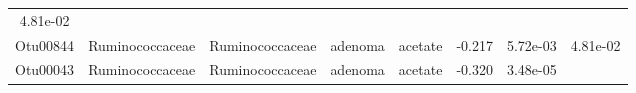 \documentclass[11pt,]{article}
\begin{document}
\begin{longtable}[]{@{}cccccccc@{}}
\begin{minipage}[t]{0.08\columnwidth}
4.81e-02\strut
\end{minipage}\tabularnewline
\begin{minipage}[t]{0.08\columnwidth}\centering\strut
Otu00844\strut
\end{minipage} & \begin{minipage}[t]{0.15\columnwidth}\centering\strut
Ruminococcaceae\strut
\end{minipage} & \begin{minipage}[t]{0.15\columnwidth}\centering\strut
Ruminococcaceae\strut
\end{minipage} & \begin{minipage}[t]{0.08\columnwidth}\centering\strut
adenoma\strut
\end{minipage} & \begin{minipage}[t]{0.09\columnwidth}\centering\strut
acetate\strut
\end{minipage} & \begin{minipage}[t]{0.07\columnwidth}\centering\strut
-0.217\strut
\end{minipage} & \begin{minipage}[t]{0.08\columnwidth}\centering\strut
5.72e-03\strut
\end{minipage} & \begin{minipage}[t]{0.08\columnwidth}\centering\strut
4.81e-02\strut
\end{minipage}\tabularnewline
\begin{minipage}[t]{0.08\columnwidth}\centering\strut
Otu00043\strut
\end{minipage} & \begin{minipage}[t]{0.15\columnwidth}\centering\strut
Ruminococcaceae\strut
\end{minipage} & \begin{minipage}[t]{0.15\columnwidth}\centering\strut
Ruminococcaceae\strut
\end{minipage} & \begin{minipage}[t]{0.08\columnwidth}\centering\strut
adenoma\strut
\end{minipage} & \begin{minipage}[t]{0.09\columnwidth}\centering\strut
acetate\strut
\end{minipage} & \begin{minipage}[t]{0.07\columnwidth}\centering\strut
-0.320\strut
\end{minipage} & \begin{minipage}[t]{0.08\columnwidth}\centering\strut
3.48e-05\strut
\end{minipage} & \begin{minipage}[t]{0.08\columnwidth}\centering\strut

\end{minipage}
\end{longtable}
\end{document}
